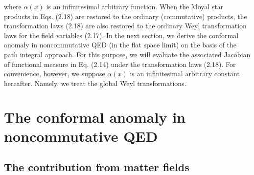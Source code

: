 \documentclass[a4paper,12pt]{article}
\begin{document}
%
where $\alpha(x)$ is an infinitesimal arbitrary function. When the Moyal star  
products in Eqs. (2.18) are restored to the ordinary (commutative) products, 
the transformation laws (2.18) are also restored to the ordinary Weyl 
transformation laws for the field variables (2.17). In the next section, 
we derive the conformal anomaly in noncommutative QED 
(in the flat space limit) on the basis of the path integral approach. 
For this purpose, we will 
evaluate the associated Jacobian of functional measure in Eq. (2.14) under 
the transformation laws (2.18). For convenience, 
however, we suppose $\alpha(x)$ is an infinitesimal arbitrary constant 
hereafter. Namely, we treat the global Weyl transformations. 

%
%
%
\section{The conformal anomaly in noncommutative QED}
\subsection{The contribution from matter fields}
\setcounter{equation}{0}
\addtocounter{enumi}{1}
%
\end{document}
